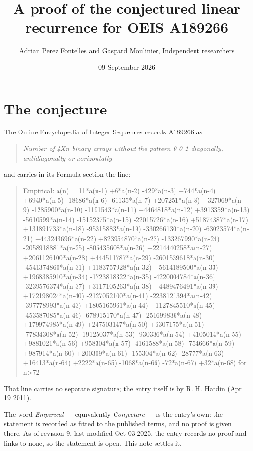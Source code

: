 \documentclass[11pt]{article}
\title{A proof of the conjectured linear recurrence for OEIS A189266}
\author{Adrian Perez Fontelles and Gaspard Moulinier, Independent researchers}
\date{09 September 2026}
\theoremstyle{definition}
\begin{document}
\maketitle
\section{The conjecture}

The Online Encyclopedia of Integer Sequences records \href{https://oeis.org/A189266}{A189266} as

\begin{quote}\itshape Number of 4Xn binary arrays without the pattern 0 0 1 diagonally, antidiagonally or horizontally\end{quote}

and carries in its Formula section the line:

\begin{quote}\ttfamily Empirical: a(n) = 11*a(n-1) +6*a(n-2) -429*a(n-3) +744*a(n-4) +6940*a(n-5) -18686*a(n-6) -61135*a(n-7) +207251*a(n-8) +327069*a(n-9) -1285900*a(n-10) -1191543*a(n-11) +4464818*a(n-12) +3913359*a(n-13) -5610599*a(n-14) -15152375*a(n-15) -22015726*a(n-16) +51874387*a(n-17) +131891733*a(n-18) -95315883*a(n-19) -330266130*a(n-20) -63023574*a(n-21) +443243696*a(n-22) +823954870*a(n-23) -133267990*a(n-24) -2058918881*a(n-25) -805435608*a(n-26) +2214440258*a(n-27) +2061126100*a(n-28) +444511787*a(n-29) -2601539618*a(n-30) -4541374860*a(n-31) +1183757928*a(n-32) +5614189500*a(n-33) +1968385910*a(n-34) -1723818322*a(n-35) -4220004784*a(n-36) -3239576374*a(n-37) +3117105263*a(n-38) +4489476491*a(n-39) +172198024*a(n-40) -2127052100*a(n-41) -2238121394*a(n-42) -397778993*a(n-43) +1805165961*a(n-44) +1127845510*a(n-45) -453587085*a(n-46) -678915170*a(n-47) -251699836*a(n-48) +179974985*a(n-49) +247503147*a(n-50) +6307175*a(n-51) -77834308*a(n-52) -19125037*a(n-53) -930336*a(n-54) +4105014*a(n-55) +9881021*a(n-56) +958304*a(n-57) -4161588*a(n-58) -754666*a(n-59) +987914*a(n-60) +200309*a(n-61) -155304*a(n-62) -28777*a(n-63) +16413*a(n-64) +2222*a(n-65) -1068*a(n-66) -72*a(n-67) +32*a(n-68) for n>72\end{quote}

That line carries no separate signature; the entry itself is by R. H. Hardin (Apr 19 2011).

The word {\itshape Empirical} --- equivalently {\itshape Conjecture} --- is the entry's own: the statement is recorded as fitted to the published terms, and no proof is given there. As of revision 9, last modified Oct 03 2025, the entry records no proof and links to none, so the statement is open. This note settles it.
\end{document}
